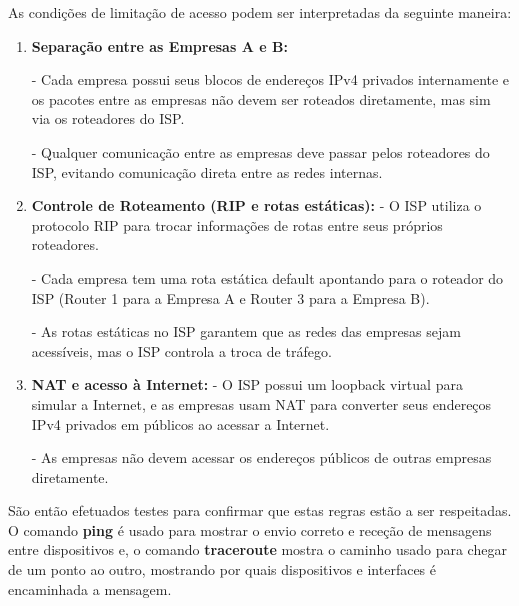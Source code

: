 \documentclass[11pt,english, openright, oneside]{book}
\begin{document}
As condições de limitação de acesso podem ser interpretadas da seguinte maneira:
\begin{enumerate}
    \item \textbf{Separação entre as Empresas A e B:} \par
    - Cada empresa possui seus blocos de endereços IPv4 privados internamente e os pacotes entre as empresas não devem ser roteados diretamente, mas sim via os roteadores do ISP. \par
    - Qualquer comunicação entre as empresas deve passar pelos roteadores do ISP, evitando comunicação direta entre as redes internas. \par

    \item \textbf{Controle de Roteamento (RIP e rotas estáticas):}
    - O ISP utiliza o protocolo RIP para trocar informações de rotas entre seus próprios roteadores. \par
    - Cada empresa tem uma rota estática default apontando para o roteador do ISP (Router 1 para a Empresa A e Router 3 para a Empresa B). \par
    - As rotas estáticas no ISP garantem que as redes das empresas sejam acessíveis, mas o ISP controla a troca de tráfego. \par

    \item \textbf{NAT e acesso à Internet:}
    - O ISP possui um loopback virtual para simular a Internet, e as empresas usam NAT para converter seus endereços IPv4 privados em públicos ao acessar a Internet. \par
    - As empresas não devem acessar os endereços públicos de outras empresas diretamente. \par
\end{enumerate} \par \vspace{0.4cm}

São então efetuados testes para confirmar que estas regras estão a ser respeitadas. O comando \textbf{ping} é usado para mostrar o envio correto e receção de mensagens entre dispositivos e, o comando \textbf{traceroute} mostra o caminho usado para chegar de um ponto ao outro, mostrando por quais dispositivos e interfaces é encaminhada a mensagem. \par
\end{document}
